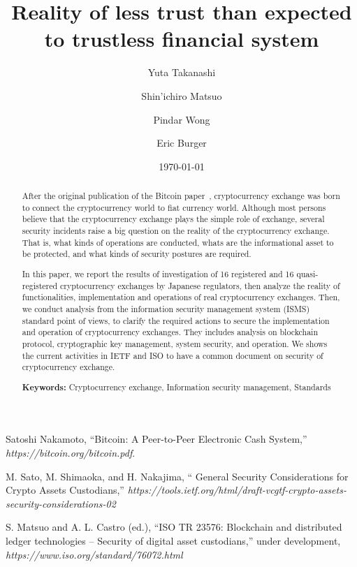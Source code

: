 \documentclass[english]{llncs}
\title{Reality of less trust than expected to trustless financial system}
\author{
Yuta Takanashi\inst{1,2}\and Shin'ichiro Matsuo \inst{1} \and Pindar Wong\inst{3} \and Eric Burger\inst{1}}
\institute{Georgetown University
\and Financial Services Agency
\and VeriFi Ltd.}
\date{\today}
\begin{document}
\maketitle

\begin{abstract}
After the original publication of the Bitcoin paper~\cite{N08}, cryptocurrency exchange was born to connect the cryptocurrency world 
to fiat currency world. Although most persons believe that the cryptocurrency exchange plays the simple role of exchange, 
several security incidents raise a big question on the reality of the cryptocurrency exchange. That is, what kinds of operations
are conducted, whats are the informational asset to be protected, and what kinds of security postures are required.

In this paper, we report the results of investigation of 16 registered and 16 quasi-registered cryptocurrency
exchanges by Japanese regulators, then analyze the reality of functionalities, implementation and operations of real cryptocurrency exchanges.
Then, we conduct analysis from the information security management system (ISMS) standard point of views, to clarify
the required actions to secure the implementation and operation of cryptocurrency exchanges. They includes analysis on
blockchain protocol, cryptographic key management, system security, and operation. We shows the current activities in IETF and 
ISO to have a common document on security of cryptocurrency exchange.

{\bf Keywords:} Cryptocurrency exchange, Information security management, Standards
\end{abstract}








\begin{thebibliography}{21}
 Satoshi Nakamoto, ``Bitcoin: A Peer-to-Peer Electronic Cash System,'' \textit{https://bitcoin.org/bitcoin.pdf}.

M. Sato, M. Shimaoka, and H. Nakajima, ``  General Security Considerations for Crypto Assets Custodians,''
 \textit{https://tools.ietf.org/html/draft-vcgtf-crypto-assets-security-considerations-02}

S. Matsuo and A. L. Castro (ed.), ``ISO TR 23576: Blockchain and distributed ledger technologies -- Security of digital asset custodians,''  under development,
\textit{https://www.iso.org/standard/76072.html}


\end{thebibliography}
\end{document}

